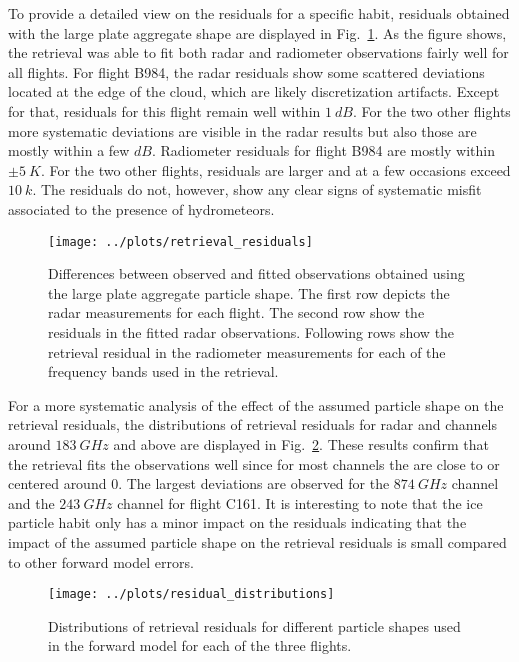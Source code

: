 \documentclass[journal abbreviation, manuscript]{copernicus}
\begin{document}
To provide a detailed view on the residuals for a specific habit, residuals
obtained with the large plate aggregate shape are displayed in
Fig.~\ref{fig:residuals}. As the figure shows, the retrieval was able
to fit both radar and radiometer observations fairly well for all flights. For
flight B984, the radar residuals show some scattered deviations located at the
edge of the cloud, which are likely discretization artifacts. Except for that,
residuals for this flight remain well within $1\ \unit{dB}$. For the two other
flights more systematic deviations are visible in the radar results but also
those are mostly within a few $\unit{dB}$. Radiometer residuals for flight B984
are mostly within $\pm 5\ \unit{K}$. For the two other flights, residuals are
larger and at a few occasions exceed $10 \ \unit{k}$. The residuals do not,
however, show any clear signs of systematic misfit associated to the presence of
hydrometeors.

\begin{figure}[!hbpt]
  \centering
  \texttt{[image: ../plots/retrieval\_residuals]}
  \caption{Differences between observed and fitted observations obtained
    using the large plate aggregate particle shape. The first row depicts
    the radar measurements for each flight. The second row show the residuals
    in the fitted radar observations. Following rows show the retrieval residual
    in the radiometer measurements for each of the frequency bands used in
    the retrieval.
    }
  \label{fig:residuals}
\end{figure}

For a more systematic analysis of the effect of the assumed particle shape on
the retrieval residuals, the distributions of retrieval residuals for radar and
channels around $183\ \unit{GHz}$ and above are displayed in
Fig.~\ref{fig:residuals_box}. These results confirm that the retrieval
fits the observations well since for most channels the are close to or
centered around 0. The largest deviations are observed for the $874\ \unit{GHz}$
channel and the $243\ \unit{GHz}$ channel for flight C161. It is interesting
to note that the ice particle habit only has a minor impact on the residuals
indicating that the impact of the assumed particle shape on the retrieval
residuals is small compared to other forward model errors.


\begin{figure}[!hbpt]
  \centering
  \texttt{[image: ../plots/residual\_distributions]}
  \caption{Distributions of retrieval residuals for different particle
    shapes used in the forward model for each of the three flights.}
  \label{fig:residuals_box}
\end{figure}
\end{document}
